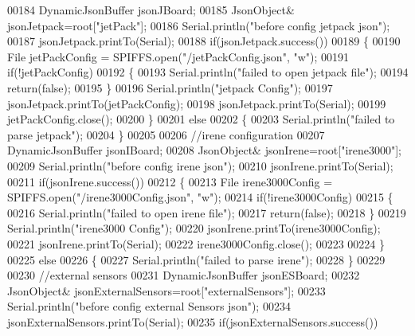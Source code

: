 \begin{DoxyCode}
00184     DynamicJsonBuffer jsonJBoard;
00185         JsonObject& jsonJetpack=root[\textcolor{stringliteral}{"jetPack"}];
00186     Serial.println(\textcolor{stringliteral}{"before config jetpack json"});
00187     jsonJetpack.printTo(Serial);
00188     \textcolor{keywordflow}{if}(jsonJetpack.success())
00189     \{   
00190         File jetPackConfig = SPIFFS.open(\textcolor{stringliteral}{"/jetPackConfig.json"}, \textcolor{stringliteral}{"w"});   
00191         \textcolor{keywordflow}{if}(!jetPackConfig)
00192         \{
00193             Serial.println(\textcolor{stringliteral}{"failed to open jetpack file"});
00194             \textcolor{keywordflow}{return}(\textcolor{keyword}{false});
00195         \}
00196         Serial.println(\textcolor{stringliteral}{"jetpack Config"});   
00197         jsonJetpack.printTo(jetPackConfig);
00198         jsonJetpack.printTo(Serial);
00199         jetPackConfig.close();
00200     \}
00201     \textcolor{keywordflow}{else}
00202     \{
00203         Serial.println(\textcolor{stringliteral}{"failed to parse jetpack"});  
00204     \}
00205     
00206     \textcolor{comment}{//irene configuration   }
00207     DynamicJsonBuffer jsonIBoard;
00208         JsonObject& jsonIrene=root[\textcolor{stringliteral}{"irene3000"}];
00209     Serial.println(\textcolor{stringliteral}{"before config irene json"}); 
00210     jsonIrene.printTo(Serial);
00211     \textcolor{keywordflow}{if}(jsonIrene.success())
00212     \{
00213         File irene3000Config = SPIFFS.open(\textcolor{stringliteral}{"/irene3000Config.json"}, \textcolor{stringliteral}{"w"});   
00214         \textcolor{keywordflow}{if}(!irene3000Config)
00215         \{
00216             Serial.println(\textcolor{stringliteral}{"failed to open irene file"});
00217             \textcolor{keywordflow}{return}(\textcolor{keyword}{false});
00218         \}
00219         Serial.println(\textcolor{stringliteral}{"irene3000 Config"});
00220         jsonIrene.printTo(irene3000Config);
00221         jsonIrene.printTo(Serial);
00222         irene3000Config.close();
00223     
00224     \}
00225     \textcolor{keywordflow}{else}
00226     \{
00227         Serial.println(\textcolor{stringliteral}{"failed to parse irene"});    
00228     \}
00229     
00230     \textcolor{comment}{//external sensors}
00231     DynamicJsonBuffer jsonESBoard;
00232         JsonObject& jsonExternalSensors=root[\textcolor{stringliteral}{"externalSensors"}];
00233     Serial.println(\textcolor{stringliteral}{"before config external Sensors json"});
00234     jsonExternalSensors.printTo(Serial);
00235     \textcolor{keywordflow}{if}(jsonExternalSensors.success())

\end{DoxyCode}
